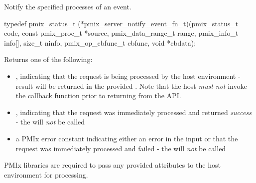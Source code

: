 \summary

Notify the specified processes of an event.

\format

\cspecificstart
\begin{codepar}
typedef pmix_status_t (*pmix_server_notify_event_fn_t)(pmix_status_t code,
                             const pmix_proc_t *source,
                             pmix_data_range_t range,
                             pmix_info_t info[],
                             size_t ninfo,
                             pmix_op_cbfunc_t cbfunc,
                             void *cbdata);
\end{codepar}
\cspecificend

\begin{arglist}
\end{arglist}

Returns one of the following:

\begin{itemize}
    \item {}, indicating that the request is being processed by the host environment - result will be returned in the provided . Note that the host \emph{must not} invoke the callback function prior to returning from the \ac{API}.
    \item {}, indicating that the request was immediately processed and returned \textit{success} - the  will \textit{not} be called
    \item a PMIx error constant indicating either an error in the input or that the request was immediately processed and failed - the  will \textit{not} be called
\end{itemize}

\reqattrstart
\ac{PMIx} libraries are required to pass any provided attributes to the host environment for processing.

